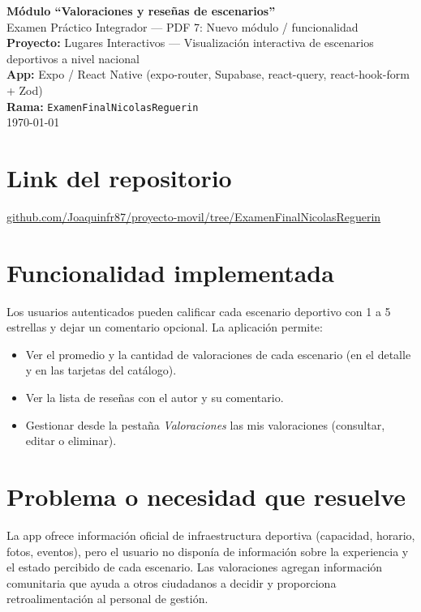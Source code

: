 \documentclass[11pt,a4paper]{article}
\begin{document}
\begin{center}
{\LARGE\bfseries Módulo ``Valoraciones y reseñas de escenarios''}\\[0.6em]
{\large Examen Práctico Integrador --- PDF 7: Nuevo módulo / funcionalidad}\\[0.4em]
\textbf{Proyecto:} Lugares Interactivos --- Visualización interactiva de escenarios deportivos a nivel nacional\\[0.3em]
\textbf{App:} Expo / React Native (expo-router, Supabase, react-query, react-hook-form + Zod)\\
\textbf{Rama:} \texttt{ExamenFinalNicolasReguerin}\\[0.5em]
\today
\end{center}

\section{Link del repositorio}
\label{sec:link}

\href{https://github.com/Joaquinfr87/proyecto-movil/tree/ExamenFinalNicolasReguerin}
     {github.com/Joaquinfr87/proyecto-movil/tree/ExamenFinalNicolasReguerin}

\section{Funcionalidad implementada}
\label{sec:funcionalidad}

Los usuarios autenticados pueden calificar cada escenario deportivo con 1 a 5 estrellas
y dejar un comentario opcional. La aplicación permite:

\begin{itemize}
  \item Ver el promedio y la cantidad de valoraciones de cada escenario
        (en el detalle y en las tarjetas del catálogo).
  \item Ver la lista de reseñas con el autor y su comentario.
  \item Gestionar desde la pestaña \emph{Valoraciones} las mis valoraciones
        (consultar, editar o eliminar).
\end{itemize}

\section{Problema o necesidad que resuelve}
\label{sec:problema}

La app ofrece información oficial de infraestructura deportiva (capacidad, horario, fotos,
eventos), pero el usuario no disponía de información sobre la experiencia y el estado
percibido de cada escenario. Las valoraciones agregan información comunitaria que ayuda a otros
ciudadanos a decidir y proporciona retroalimentación al personal de gestión.
\end{document}
